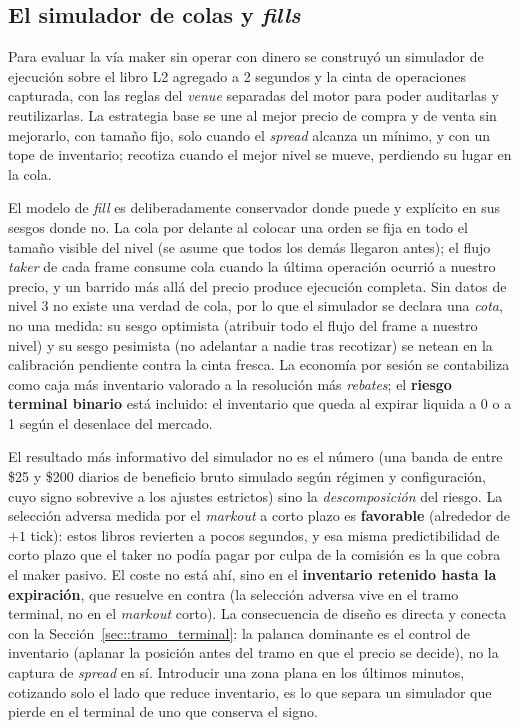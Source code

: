 \subsection{El simulador de colas y \emph{fills}}
\label{sec::simulador_maker}

Para evaluar la vía maker sin operar con dinero se construyó un simulador de ejecución
sobre el libro L2 agregado a 2 segundos y la cinta de operaciones capturada, con las
reglas del \emph{venue} separadas del motor para poder auditarlas y reutilizarlas. La
estrategia base se une al mejor precio de compra y de venta sin mejorarlo, con tamaño
fijo, solo cuando el \emph{spread} alcanza un mínimo, y con un tope de inventario; recotiza
cuando el mejor nivel se mueve, perdiendo su lugar en la cola.

El modelo de \emph{fill} es deliberadamente conservador donde puede y explícito en sus
sesgos donde no. La cola por delante al colocar una orden se fija en todo el tamaño
visible del nivel (se asume que todos los demás llegaron antes); el flujo \emph{taker} de
cada frame consume cola cuando la última operación ocurrió a nuestro precio, y un barrido
más allá del precio produce ejecución completa. Sin datos de nivel 3 no existe una verdad
de cola, por lo que el simulador se declara una \emph{cota}, no una medida: su sesgo
optimista (atribuir todo el flujo del frame a nuestro nivel) y su sesgo pesimista (no
adelantar a nadie tras recotizar) se netean en la calibración pendiente contra la cinta
fresca. La economía por sesión se contabiliza como caja más inventario valorado a la
resolución más \emph{rebates}; el \textbf{riesgo terminal binario} está incluido: el
inventario que queda al expirar liquida a 0 o a 1 según el desenlace del mercado.

El resultado más informativo del simulador no es el número (una banda de entre \$25 y
\$200 diarios de beneficio bruto simulado según régimen y configuración, cuyo signo
sobrevive a los ajustes estrictos) sino la \emph{descomposición} del riesgo. La selección
adversa medida por el \emph{markout} a corto plazo es \textbf{favorable} (alrededor de
$+1$ tick): estos libros revierten a pocos segundos, y esa misma predictibilidad de corto
plazo que el taker no podía pagar por culpa de la comisión es la que cobra el maker
pasivo. El coste no está ahí, sino en el \textbf{inventario retenido hasta la
expiración}, que resuelve en contra (la selección adversa vive en el tramo terminal, no en
el \emph{markout} corto). La consecuencia de diseño es directa y conecta con la
Sección~\ref{sec::tramo_terminal}: la palanca dominante es el control de inventario
(aplanar la posición antes del tramo en que el precio se decide), no la captura de
\emph{spread} en sí. Introducir una zona plana en los últimos minutos, cotizando solo el
lado que reduce inventario, es lo que separa un simulador que pierde en el terminal de uno
que conserva el signo.

